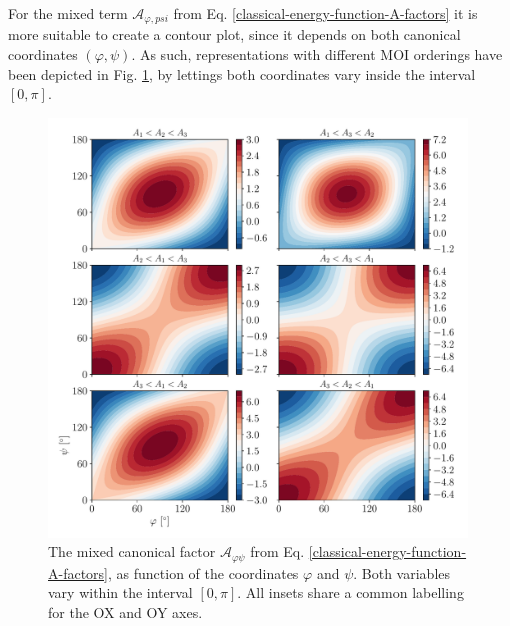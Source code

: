 For the mixed term $\mathcal{A}_{\varphi,psi}$ from Eq. \ref{classical-energy-function-A-factors} it is more suitable to create a contour plot, since it depends on both canonical coordinates $(\varphi,\psi)$. As such, representations with different MOI orderings have been depicted in Fig. \ref{fig-A-mixed-canonical}, by lettings both coordinates vary inside the interval $[0,\pi]$.
\begin{figure}
    \centering
    \includegraphics[width=0.99\textwidth]{Chapters/Figures/A_mixed.pdf}
    \caption{The mixed canonical factor $\mathcal{A}_{\varphi\psi}$ from Eq. \ref{classical-energy-function-A-factors}, as function of the coordinates $\varphi$ and $\psi$. Both variables vary within the interval $[0,\pi]$. All insets share a common labelling for the OX and OY axes.}
    \label{fig-A-mixed-canonical}
\end{figure}

